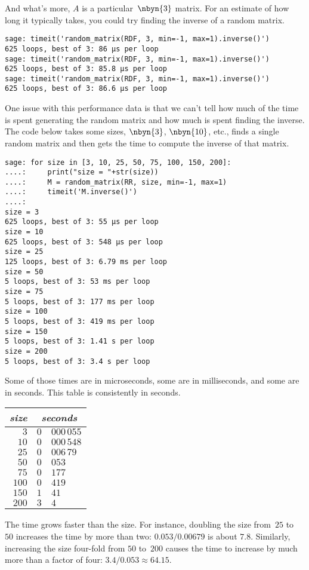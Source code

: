And what's more, $A$ is a particular~$\nbyn{3}$ matrix. 
For an estimate of
how long it typically takes,
you could try finding the inverse of a random matrix.
\begin{lstlisting}
sage: timeit('random_matrix(RDF, 3, min=-1, max=1).inverse()')
625 loops, best of 3: 86 μs per loop
sage: timeit('random_matrix(RDF, 3, min=-1, max=1).inverse()')
625 loops, best of 3: 85.8 μs per loop
sage: timeit('random_matrix(RDF, 3, min=-1, max=1).inverse()')
625 loops, best of 3: 86.6 μs per loop
\end{lstlisting}

One issue with this performance data is that
we can't tell
how much of the time is spent generating
the random matrix and how much is spent finding the inverse.
The code below takes some sizes, $\nbyn{3}$, $\nbyn{10}$, etc.,
finds a single random matrix and then 
gets the time to compute the inverse of that matrix.
\begin{lstlisting}
sage: for size in [3, 10, 25, 50, 75, 100, 150, 200]:
....:     print("size = "+str(size))
....:     M = random_matrix(RR, size, min=-1, max=1)
....:     timeit('M.inverse()')
....:     
size = 3
625 loops, best of 3: 55 μs per loop
size = 10
625 loops, best of 3: 548 μs per loop
size = 25
125 loops, best of 3: 6.79 ms per loop
size = 50
5 loops, best of 3: 53 ms per loop
size = 75
5 loops, best of 3: 177 ms per loop
size = 100
5 loops, best of 3: 419 ms per loop
size = 150
5 loops, best of 3: 1.41 s per loop
size = 200
5 loops, best of 3: 3.4 s per loop
\end{lstlisting}
Some of those times are in microseconds, some are in milliseconds, and some
are in seconds.
This table is consistently in seconds.
\begin{center}
  \begin{tabular}{r|r@{.}l}
    \textit{size}     &\multicolumn{2}{c}{\textit{seconds}}  \\  \hline
    $3$      &$0$ &$000\,055$ \\
    $10$     &$0$ &$000\,548$ \\
    $25$     &$0$ &$006\,79$ \\
    $50$     &$0$ &$053$ \\
    $75$     &$0$ &$177$ \\
    $100$    &$0$ &$419$ \\
    $150$    &$1$ &$41$ \\
    $200$    &$3$ &$4$ 
  \end{tabular}
\end{center}
The time grows faster than the size.
For instance, doubling the size from~$25$ to~$50$ increases the time by
more than two: $0.053/0.00679$ is about $7.8$.
Similarly, increasing the size four-fold from $50$ to~$200$ causes the time to 
increase by much more than a factor of four: $3.4/0.053\approx 64.15$. 

